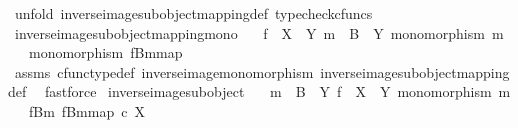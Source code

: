 \begin{isabellebody}
\ {\isacharparenleft}{\kern0pt}unfold\ inverse{\isacharunderscore}{\kern0pt}image{\isacharunderscore}{\kern0pt}subobject{\isacharunderscore}{\kern0pt}mapping{\isacharunderscore}{\kern0pt}def{}{\isacharcomma}{\kern0pt}\ typecheck{\isacharunderscore}{\kern0pt}cfuncs{\isacharparenright}{\kern0pt}%
\endisatagproof
{\isafoldproof}%
%
\isadelimproof
\isanewline
%
\endisadelimproof
\isanewline
{}\isamarkupfalse%
\ inverse{\isacharunderscore}{\kern0pt}image{\isacharunderscore}{\kern0pt}subobject{\isacharunderscore}{\kern0pt}mapping{\isacharunderscore}{\kern0pt}mono{\isacharcolon}{\kern0pt}\isanewline
\ \ \ {\isachardoublequoteopen}f\ {\isacharcolon}{\kern0pt}\ X\ {\isasymrightarrow}\ Y{\isachardoublequoteclose}\ {\isachardoublequoteopen}m\ {\isacharcolon}{\kern0pt}\ B\ {\isasymrightarrow}\ Y{\isachardoublequoteclose}\ {\isachardoublequoteopen}monomorphism\ m{\isachardoublequoteclose}\isanewline
\ \ \ {\isachardoublequoteopen}monomorphism\ {\isacharparenleft}{\kern0pt}{\isacharbrackleft}{\kern0pt}f\isactrlsup {\isacharminus}{\kern0pt}B{\isasymrparr}\isactrlbsub m\isactrlesub {\isacharbrackright}{\kern0pt}map{\isacharparenright}{\kern0pt}{\isachardoublequoteclose}\isanewline
%
\isadelimproof
\ \ %
\endisadelimproof
%
\isatagproof
{}\isamarkupfalse%
\ assms\ cfunc{\isacharunderscore}{\kern0pt}type{\isacharunderscore}{\kern0pt}def\ inverse{\isacharunderscore}{\kern0pt}image{\isacharunderscore}{\kern0pt}monomorphism\ inverse{\isacharunderscore}{\kern0pt}image{\isacharunderscore}{\kern0pt}subobject{\isacharunderscore}{\kern0pt}mapping{\isacharunderscore}{\kern0pt}def\ \isamarkupfalse%
\ fastforce%
\endisatagproof
{\isafoldproof}%
%
\isadelimproof
\isanewline
%
\endisadelimproof
\isanewline
{}\isamarkupfalse%
\ inverse{\isacharunderscore}{\kern0pt}image{\isacharunderscore}{\kern0pt}subobject{\isacharcolon}{\kern0pt}\isanewline
\ \ \ {\isachardoublequoteopen}m\ {\isacharcolon}{\kern0pt}\ B\ {\isasymrightarrow}\ Y{\isachardoublequoteclose}\ {\isachardoublequoteopen}f\ {\isacharcolon}{\kern0pt}\ X\ {\isasymrightarrow}\ Y{\isachardoublequoteclose}\ {\isachardoublequoteopen}monomorphism\ m{\isachardoublequoteclose}\isanewline
\ \ \ {\isachardoublequoteopen}{\isacharparenleft}{\kern0pt}f\isactrlsup {\isacharminus}{\kern0pt}B{\isasymrparr}\isactrlbsub m\isactrlesub {\isacharcomma}{\kern0pt}\ {\isacharbrackleft}{\kern0pt}f\isactrlsup {\isacharminus}{\kern0pt}B{\isasymrparr}\isactrlbsub m\isactrlesub {\isacharbrackright}{\kern0pt}map{\isacharparenright}{\kern0pt}\ {\isasymsubseteq}\isactrlsub c\ X{\isachardoublequoteclose}\isanewline

\end{isabellebody}
